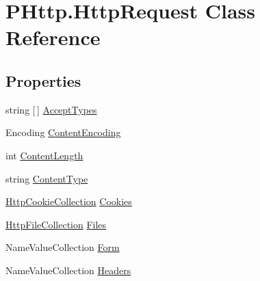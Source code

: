 \hypertarget{class_p_http_1_1_http_request}{}\section{P\+Http.\+Http\+Request Class Reference}
\label{class_p_http_1_1_http_request}
\subsection*{Properties}
\begin{DoxyCompactItemize}
\item 
string \mbox{[}$\,$\mbox{]} \hyperlink{class_p_http_1_1_http_request_ab0c25acac17e02b4d528355619a1dbe8}{Accept\+Types}
\item 
Encoding \hyperlink{class_p_http_1_1_http_request_a6de8777f6a6f8549eaf9483e6db3a7aa}{Content\+Encoding}
\item 
int \hyperlink{class_p_http_1_1_http_request_abdfd614162ae3309531b43acb27752be}{Content\+Length}
\item 
string \hyperlink{class_p_http_1_1_http_request_a2c6e675acf83c32694eb89be42bf8946}{Content\+Type}
\item 
\hyperlink{class_p_http_1_1_http_cookie_collection}{Http\+Cookie\+Collection} \hyperlink{class_p_http_1_1_http_request_a96e08ff6c4238a170e015745c143e6e8}{Cookies}
\item 
\hyperlink{class_p_http_1_1_http_file_collection}{Http\+File\+Collection} \hyperlink{class_p_http_1_1_http_request_a9036c97c0bc6ff55255e248acef857b9}{Files}
\item 
Name\+Value\+Collection \hyperlink{class_p_http_1_1_http_request_a42438bf587e2b2fcf766aff189c9b09d}{Form}
\item 
Name\+Value\+Collection \hyperlink{class_p_http_1_1_http_request_adead26e148318e1b4c2909beb5c18dce}{Headers}

\end{DoxyCompactItemize}
